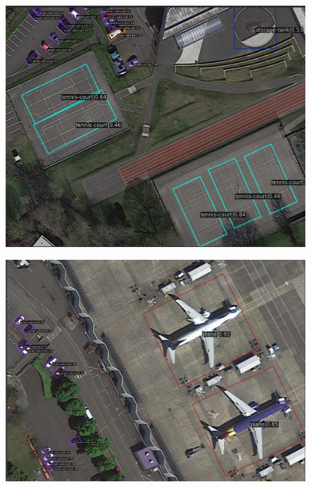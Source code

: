\documentclass[11pt]{beamer}
\theoremstyle{definition}
\theoremstyle{plain}
\theoremstyle{plain}
\theoremstyle{remark}
\begin{document}
\begin{frame}
	\begin{figure}
		\centering
		\includegraphics[width=0.9\linewidth]{res_mmrotate5}
	
		\label{fig:resmmrotate5}
	\end{figure}
\end{frame}
\begin{frame}
	\begin{figure}
		\centering
		\includegraphics[width=0.9\linewidth]{res_mmrotate2}
		\label{fig:resmmrotate2}
	\end{figure}
\end{frame}
\end{document}
